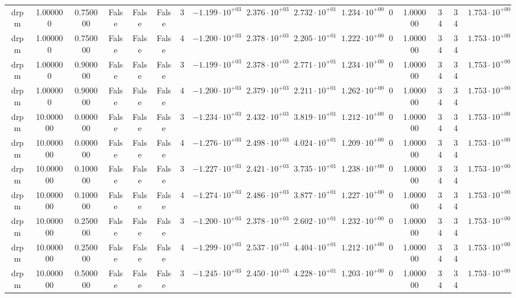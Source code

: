 \begin{table}
\begin{tabular}{cccccccccccccccc}
drpm & 1.000000 & 0.750000 & False & False & False & 3 & $-1.199 \cdot 10^{+03}$ & $2.376 \cdot 10^{+03}$ & $2.732 \cdot 10^{+01}$ & $1.234 \cdot 10^{+00}$ & 0 & 1.000000 & 34 & 34 & $1.753 \cdot 10^{+00}$ \\
drpm & 1.000000 & 0.750000 & False & False & False & 4 & $-1.200 \cdot 10^{+03}$ & $2.378 \cdot 10^{+03}$ & $2.205 \cdot 10^{+01}$ & $1.222 \cdot 10^{+00}$ & 0 & 1.000000 & 34 & 34 & $1.753 \cdot 10^{+00}$ \\
drpm & 1.000000 & 0.900000 & False & False & False & 3 & $-1.199 \cdot 10^{+03}$ & $2.378 \cdot 10^{+03}$ & $2.771 \cdot 10^{+01}$ & $1.234 \cdot 10^{+00}$ & 0 & 1.000000 & 34 & 34 & $1.753 \cdot 10^{+00}$ \\
drpm & 1.000000 & 0.900000 & False & False & False & 4 & $-1.200 \cdot 10^{+03}$ & $2.379 \cdot 10^{+03}$ & $2.211 \cdot 10^{+01}$ & $1.262 \cdot 10^{+00}$ & 0 & 1.000000 & 34 & 34 & $1.753 \cdot 10^{+00}$ \\
drpm & 10.000000 & 0.000000 & False & False & False & 3 & $-1.234 \cdot 10^{+03}$ & $2.432 \cdot 10^{+03}$ & $3.819 \cdot 10^{+01}$ & $1.212 \cdot 10^{+00}$ & 0 & 1.000000 & 34 & 34 & $1.753 \cdot 10^{+00}$ \\
drpm & 10.000000 & 0.000000 & False & False & False & 4 & $-1.276 \cdot 10^{+03}$ & $2.498 \cdot 10^{+03}$ & $4.024 \cdot 10^{+01}$ & $1.209 \cdot 10^{+00}$ & 0 & 1.000000 & 34 & 34 & $1.753 \cdot 10^{+00}$ \\
drpm & 10.000000 & 0.100000 & False & False & False & 3 & $-1.227 \cdot 10^{+03}$ & $2.421 \cdot 10^{+03}$ & $3.735 \cdot 10^{+01}$ & $1.238 \cdot 10^{+00}$ & 0 & 1.000000 & 34 & 34 & $1.753 \cdot 10^{+00}$ \\
drpm & 10.000000 & 0.100000 & False & False & False & 4 & $-1.274 \cdot 10^{+03}$ & $2.486 \cdot 10^{+03}$ & $3.877 \cdot 10^{+01}$ & $1.227 \cdot 10^{+00}$ & 0 & 1.000000 & 34 & 34 & $1.753 \cdot 10^{+00}$ \\
drpm & 10.000000 & 0.250000 & False & False & False & 3 & $-1.200 \cdot 10^{+03}$ & $2.378 \cdot 10^{+03}$ & $2.602 \cdot 10^{+01}$ & $1.232 \cdot 10^{+00}$ & 0 & 1.000000 & 34 & 34 & $1.753 \cdot 10^{+00}$ \\
drpm & 10.000000 & 0.250000 & False & False & False & 4 & $-1.299 \cdot 10^{+03}$ & $2.537 \cdot 10^{+03}$ & $4.404 \cdot 10^{+01}$ & $1.212 \cdot 10^{+00}$ & 0 & 1.000000 & 34 & 34 & $1.753 \cdot 10^{+00}$ \\
drpm & 10.000000 & 0.500000 & False & False & False & 3 & $-1.245 \cdot 10^{+03}$ & $2.450 \cdot 10^{+03}$ & $4.228 \cdot 10^{+01}$ & $1.203 \cdot 10^{+00}$ & 0 & 1.000000 & 34 & 34 & $1.753 \cdot 10^{+00}$ \\

\end{tabular}
\end{table}
